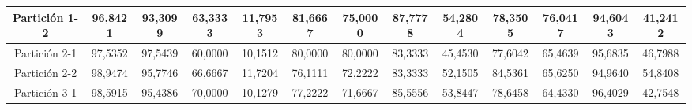 \documentclass[12pt]{article}
\begin{document}
\begin{table}[H]
{\begin{tabular}{|c|cccc|cccc|cccc|}
Partición 1-2 & \multicolumn{1}{c|}{96,8421}                                                  & \multicolumn{1}{c|}{93,3099}                                                 & \multicolumn{1}{c|}{63,3333} & 11,7953 & \multicolumn{1}{c|}{81,6667}                                                  & \multicolumn{1}{c|}{75,0000}                                                 & \multicolumn{1}{c|}{87,7778} & 54,2804 & \multicolumn{1}{c|}{78,3505}                                                  & \multicolumn{1}{c|}{76,0417}                                                 & \multicolumn{1}{c|}{94,6043} & 41,2412 \\ \hline
Partición 2-1 & \multicolumn{1}{c|}{97,5352}                                                  & \multicolumn{1}{c|}{97,5439}                                                 & \multicolumn{1}{c|}{60,0000} & 10,1512 & \multicolumn{1}{c|}{80,0000}                                                  & \multicolumn{1}{c|}{80,0000}                                                 & \multicolumn{1}{c|}{83,3333} & 45,4530 & \multicolumn{1}{c|}{77,6042}                                                  & \multicolumn{1}{c|}{65,4639}                                                 & \multicolumn{1}{c|}{95,6835} & 46,7988 \\ \hline
Partición 2-2 & \multicolumn{1}{c|}{98,9474}                                                  & \multicolumn{1}{c|}{95,7746}                                                 & \multicolumn{1}{c|}{66,6667} & 11,7204 & \multicolumn{1}{c|}{76,1111}                                                  & \multicolumn{1}{c|}{72,2222}                                                 & \multicolumn{1}{c|}{83,3333} & 52,1505 & \multicolumn{1}{c|}{84,5361}                                                  & \multicolumn{1}{c|}{65,6250}                                                 & \multicolumn{1}{c|}{94,9640} & 54,8408 \\ \hline
Partición 3-1 & \multicolumn{1}{c|}{98,5915}                                                  & \multicolumn{1}{c|}{95,4386}                                                 & \multicolumn{1}{c|}{70,0000} & 10,1279 & \multicolumn{1}{c|}{77,2222}                                                  & \multicolumn{1}{c|}{71,6667}                                                 & \multicolumn{1}{c|}{85,5556} & 53,8447 & \multicolumn{1}{c|}{78,6458}                                                  & \multicolumn{1}{c|}{64,4330}                                                 & \multicolumn{1}{c|}{96,4029} & 42,7548 \\ \hline

\end{tabular}}
\end{table}
\end{document}
